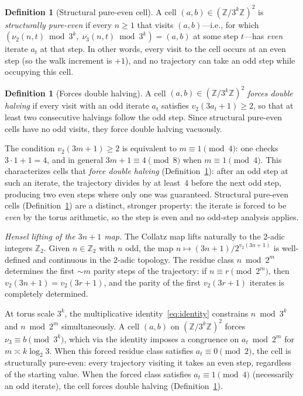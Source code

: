 \documentclass[manuscript]{aomart}
\newcommand{\Z}{\mathbb{Z}}
\theoremstyle{plain}
\theoremstyle{definition}
\newtheorem{definition}[theorem]{Definition}
\theoremstyle{remark}
\numberwithin{equation}{section}
\begin{document}
\begin{definition}[Structural pure-even cell]\label{def:structural-pe}
A cell $(a, b) \in (\Z/3^k\Z)^2$ is \emph{structurally pure-even} if
every $n \ge 1$ that visits $(a, b)$---i.e., for which
$(\nu_2(n, t) \bmod 3^k,\; \nu_3(n, t) \bmod 3^k) = (a, b)$
at some step $t$---has \emph{even} iterate $a_t$ at that step.
In other words, every visit to the cell occurs at an even step
(so the walk increment is $+1$), and no trajectory can take an
odd step while occupying this cell.
\end{definition}

\begin{definition}[Forces double halving]\label{def:forces-dh}
A cell $(a, b) \in (\Z/3^k\Z)^2$ \emph{forces double halving} if
every visit with an odd iterate $a_t$ satisfies
$v_2(3 a_t + 1) \ge 2$, so that at least two consecutive halvings
follow the odd step.  Since structural pure-even cells have no odd
visits, they force double halving vacuously.
\end{definition}

The condition $v_2(3m + 1) \ge 2$ is equivalent to $m \equiv 1 \pmod{4}$:
one checks $3 \cdot 1 + 1 = 4$, and in general $3m + 1 \equiv 4
\pmod{8}$ when $m \equiv 1 \pmod{4}$.  This characterizes cells
that \emph{force double halving} (Definition~\ref{def:forces-dh}):
after an odd step at such an iterate, the trajectory divides by
at least~$4$ before the next odd step, producing two even steps
where only one was guaranteed.
Structural pure-even cells (Definition~\ref{def:structural-pe})
are a distinct, stronger property: the iterate is forced to be
\emph{even} by the torus arithmetic, so the step is even and no
odd-step analysis applies.

\medskip\noindent
\emph{Hensel lifting of the $3n+1$ map.}\enspace
The Collatz map lifts naturally to the $2$-adic integers $\Z_2$.
Given $n \in \Z_2$ with $n$ odd, the map $n \mapsto (3n+1)/2^{v_2(3n+1)}$
is well-defined and continuous in the $2$-adic topology.  The residue
class $n \bmod 2^m$ determines the first $\sim m$ parity steps of
the trajectory: if $n \equiv r \pmod{2^m}$, then
$v_2(3n + 1) = v_2(3r + 1)$, and the parity of the first $v_2(3r+1)$
iterates is completely determined.

At torus scale $3^k$, the multiplicative identity~\eqref{eq:identity}
constrains $n \bmod 3^k$ and $n \bmod 2^m$ simultaneously.  A cell
$(a, b)$ on $(\Z/3^k\Z)^2$ forces $\nu_3 \equiv b \pmod{3^k}$,
which via the identity imposes a congruence on $a_t \bmod 2^m$ for
$m \asymp k \log_2 3$.  When this forced residue class satisfies
$a_t \equiv 0 \pmod{2}$, the cell is structurally pure-even: every
trajectory visiting it takes an even step, regardless of the
starting value.  When the forced class satisfies
$a_t \equiv 1 \pmod{4}$ (necessarily an odd iterate), the cell
forces double halving (Definition~\ref{def:forces-dh}).
\end{document}
